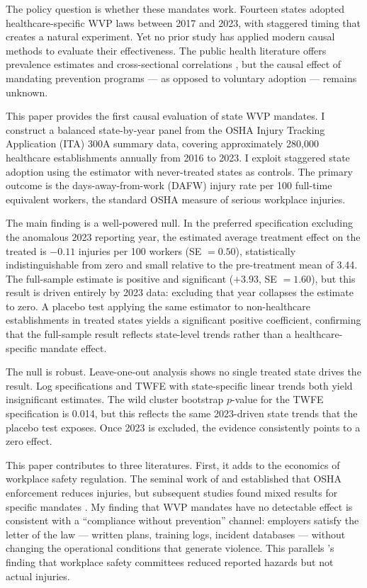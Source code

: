 \documentclass[12pt]{article}
\begin{document}
The policy question is whether these mandates work. Fourteen states adopted healthcare-specific WVP laws between 2017 and 2023, with staggered timing that creates a natural experiment. Yet no prior study has applied modern causal methods to evaluate their effectiveness. The public health literature offers prevalence estimates and cross-sectional correlations \citep{gillespie2010, groenewold2018}, but the causal effect of mandating prevention programs --- as opposed to voluntary adoption --- remains unknown.

This paper provides the first causal evaluation of state WVP mandates. I construct a balanced state-by-year panel from the OSHA Injury Tracking Application (ITA) 300A summary data, covering approximately 280,000 healthcare establishments annually from 2016 to 2023. I exploit staggered state adoption using the \citet{callaway2021} estimator with never-treated states as controls. The primary outcome is the days-away-from-work (DAFW) injury rate per 100 full-time equivalent workers, the standard OSHA measure of serious workplace injuries.

The main finding is a well-powered null. In the preferred specification excluding the anomalous 2023 reporting year, the estimated average treatment effect on the treated is $-0.11$ injuries per 100 workers (SE $= 0.50$), statistically indistinguishable from zero and small relative to the pre-treatment mean of 3.44. The full-sample estimate is positive and significant ($+3.93$, SE $= 1.60$), but this result is driven entirely by 2023 data: excluding that year collapses the estimate to zero. A placebo test applying the same estimator to non-healthcare establishments in treated states yields a significant positive coefficient, confirming that the full-sample result reflects state-level trends rather than a healthcare-specific mandate effect.

The null is robust. Leave-one-out analysis shows no single treated state drives the result. Log specifications and TWFE with state-specific linear trends both yield insignificant estimates. The wild cluster bootstrap $p$-value for the TWFE specification is 0.014, but this reflects the same 2023-driven state trends that the placebo test exposes. Once 2023 is excluded, the evidence consistently points to a zero effect.

This paper contributes to three literatures. First, it adds to the economics of workplace safety regulation. The seminal work of \citet{viscusi1979} and \citet{scholz1984} established that OSHA enforcement reduces injuries, but subsequent studies found mixed results for specific mandates \citep{gray1993, bartel1988}. My finding that WVP mandates have no detectable effect is consistent with a ``compliance without prevention'' channel: employers satisfy the letter of the law --- written plans, training logs, incident databases --- without changing the operational conditions that generate violence. This parallels \citet{levine2012}'s finding that workplace safety committees reduced reported hazards but not actual injuries.
\end{document}
